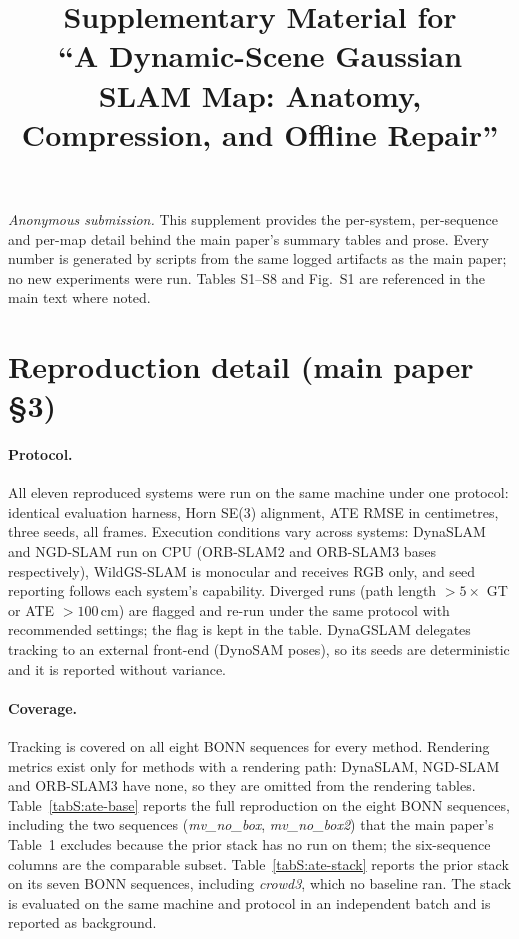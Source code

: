 \documentclass[11pt]{article}
\title{Supplementary Material for\\[2pt]
``A Dynamic-Scene Gaussian SLAM Map: Anatomy, Compression, and Offline Repair''}
\author{}
\date{}
\begin{document}
\maketitle
\vspace{-2em}
\noindent\emph{Anonymous submission.} This supplement provides the per-system,
per-sequence and per-map detail behind the main paper's summary tables and prose.
Every number is generated by scripts from the same logged artifacts as the main
paper; no new experiments were run. Tables S1--S8 and Fig.~S1 are referenced
in the main text where noted.

\section{Reproduction detail (main paper \S3)}
\paragraph{Protocol.} All eleven reproduced systems were run on the same machine
under one protocol: identical evaluation harness, Horn SE(3) alignment, ATE RMSE in
centimetres, three seeds, all frames. Execution conditions vary across systems:
DynaSLAM and NGD-SLAM run on CPU (ORB-SLAM2 and ORB-SLAM3 bases respectively),
WildGS-SLAM is monocular and receives RGB only, and seed reporting follows each
system's capability. Diverged runs (path length $>5\times$ GT or ATE
$>100$\,cm) are flagged and re-run under the same protocol with recommended
settings; the flag is kept in the table. DynaGSLAM delegates tracking to an external
front-end (DynoSAM poses), so its seeds are deterministic and it is reported without
variance.
\paragraph{Coverage.} Tracking is covered on all eight BONN sequences for every
method. Rendering metrics exist only for methods with a rendering path: DynaSLAM,
NGD-SLAM and ORB-SLAM3 have none, so they are omitted from the rendering tables.
Table~\ref{tabS:ate-base} reports the full reproduction on the
eight BONN sequences, including the two sequences (\emph{mv\_no\_box},
\emph{mv\_no\_box2}) that the main paper's Table~1 excludes because the prior stack
has no run on them; the six-sequence columns are the comparable subset.
Table~\ref{tabS:ate-stack} reports the prior stack on its seven BONN sequences,
including \emph{crowd3}, which no baseline ran. The stack is evaluated on the same
machine and protocol in an independent batch and is reported as background.




\end{document}
